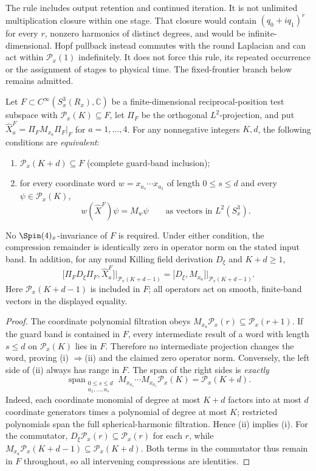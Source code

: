 \documentclass[12pt,a4paper]{article}
\begin{document}
The rule includes output retention and continued iteration. It is
not unlimited multiplication closure within one stage. That closure
would contain \((q_0+iq_1)^r\) for every \(r\), nonzero harmonics
of distinct degrees, and would be infinite-dimensional.
Hopf pullback instead commutes with the round Laplacian and can act
within \(\mathcal P_x(1)\) indefinitely. It does not force this rule,
its repeated occurrence or the assignment of stages to physical
time. The fixed-frontier branch below remains admitted.


\begin{theorem}
\label{p2c:thm:v268-sharp-word-guard-equivalence}
Let $F\subset C^\infty(S^3_x(R_x),\mathbb C)$ be a finite-dimensional
reciprocal-position test subspace with
$\mathcal P_x(K)\subseteq F$, let $\Pi_F$ be the orthogonal
$L^2$-projection, and put
$\widehat X_a^F=\Pi_FM_{x_a}\Pi_F|_F$ for $a=1,\ldots,4$.
For any nonnegative integers $K,d$, the following conditions are
\emph{equivalent}:
\begin{enumerate}
\item $\mathcal P_x(K+d)\subseteq F$ (complete guard-band inclusion);
\item for every coordinate word $w=x_{a_s}\cdots x_{a_1}$ of
length $0\le s\le d$ and every $\psi\in\mathcal P_x(K)$,
\[
 w(\widehat X^F)\psi=M_{w}\psi
 \qquad\text{as vectors in }L^2(S^3_x).
\]
\end{enumerate}
No $\Spin(4)_x$-invariance of $F$ is required.  Under either
condition, the compression remainder is identically zero in operator
norm on the stated input band.  In addition, for any round Killing
field derivation $D_\xi$ and $K+d\ge1$,
\[
 \bigl[\Pi_FD_\xi\Pi_F,\widehat X_a^F\bigr]
 \big|_{\mathcal P_x(K+d-1)}
 =\bigl[D_\xi,M_{x_a}\bigr]
 \big|_{\mathcal P_x(K+d-1)}.
\]
Here $\mathcal P_x(K+d-1)$ is included in $F$; all operators act
on smooth, finite-band vectors in the displayed equality.
\end{theorem}
\begin{proof}
The coordinate polynomial filtration obeys
$M_{x_a}\mathcal P_x(r)\subseteq\mathcal P_x(r+1)$.
If the guard band is contained in $F$, every intermediate result of a
word with length $s\le d$ on $\mathcal P_x(K)$ lies in $F$.
Therefore no intermediate projection changes the word, proving (i)
$\Rightarrow$(ii) and the claimed zero operator norm.
Conversely, the left side of (ii) always has range in $F$.
The span of the right sides is \emph{exactly}
\[
 \operatorname{span}_{\substack{0\le s\le d\\a_1,\ldots,a_s}}
 M_{x_{a_s}}\cdots M_{x_{a_1}}\mathcal P_x(K)
 =\mathcal P_x(K+d).
\]
Indeed, each coordinate monomial of degree at most $K+d$ factors
into at most $d$ coordinate generators times a polynomial of degree
at most $K$; restricted polynomials span the full spherical-harmonic
filtration.  Hence (ii) implies (i).  For the commutator,
$D_\xi\mathcal P_x(r)\subseteq\mathcal P_x(r)$ for each $r$,
while $M_{x_a}\mathcal P_x(K+d-1)\subseteq\mathcal P_x(K+d)$.
Both terms in the commutator thus remain in $F$ throughout, so
all intervening compressions are identities.
\end{proof}
\end{document}
